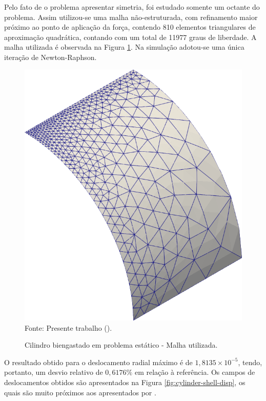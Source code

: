 Pelo fato de o problema apresentar simetria, foi estudado somente um octante do problema. Assim utilizou-se uma malha não-estruturada, com refinamento maior próximo ao ponto de aplicação da força, contendo 810 elementos triangulares de aproximação quadrática, contando com um total de 11977 graus de liberdade. A malha utilizada é observada na Figura \ref{fig:cylinder-shell-mesh}. Na simulação adotou-se uma única iteração de Newton-Raphson.

\begin{figure}[h!]
    \centering
    \caption{Cilindro biengastado em problema estático - Malha utilizada.}
    \includegraphics[width=0.3\linewidth]{Figuras/cylinder-shell/mesh1.png}
    \\Fonte: Presente trabalho (\the\year).
    \label{fig:cylinder-shell-mesh}
\end{figure}

O resultado obtido para o deslocamento radial máximo é de $1,8135\times10^{-5}$, tendo, portanto, um desvio relativo de $0,6176\%$ em relação à referência. Os campos de deslocamentos obtidos são apresentados na Figura \ref{fig:cylinder-shell-disp}, os quais são muito próximos aos apresentados por .

